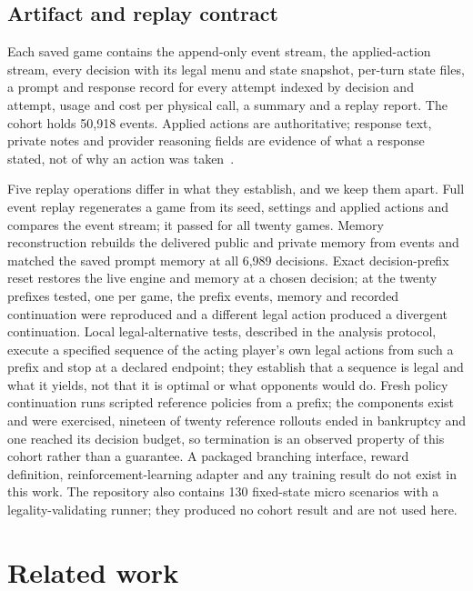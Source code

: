 \subsection{Artifact and replay contract}
\label{sec:artifacts}

Each saved game contains the append-only event stream, the applied-action stream, every decision with its legal menu and state snapshot, per-turn state files, a prompt and response record for every attempt indexed by decision and attempt, usage and cost per physical call, a summary and a replay report. The cohort holds 50,918 events. Applied actions are authoritative; response text, private notes and provider reasoning fields are evidence of what a response stated, not of why an action was taken~\cite{turpin2023unfaithful,lanham2023faithfulness}.

Five replay operations differ in what they establish, and we keep them apart. Full event replay regenerates a game from its seed, settings and applied actions and compares the event stream; it passed for all twenty games. Memory reconstruction rebuilds the delivered public and private memory from events and matched the saved prompt memory at all 6,989 decisions. Exact decision-prefix reset restores the live engine and memory at a chosen decision; at the twenty prefixes tested, one per game, the prefix events, memory and recorded continuation were reproduced and a different legal action produced a divergent continuation. Local legal-alternative tests, described in the analysis protocol, execute a specified sequence of the acting player's own legal actions from such a prefix and stop at a declared endpoint; they establish that a sequence is legal and what it yields, not that it is optimal or what opponents would do. Fresh policy continuation runs scripted reference policies from a prefix; the components exist and were exercised, nineteen of twenty reference rollouts ended in bankruptcy and one reached its decision budget, so termination is an observed property of this cohort rather than a guarantee. A packaged branching interface, reward definition, reinforcement-learning adapter and any training result do not exist in this work. The repository also contains 130 fixed-state micro scenarios with a legality-validating runner; they produced no cohort result and are not used here.

\section{Related work}
\label{sec:related}

